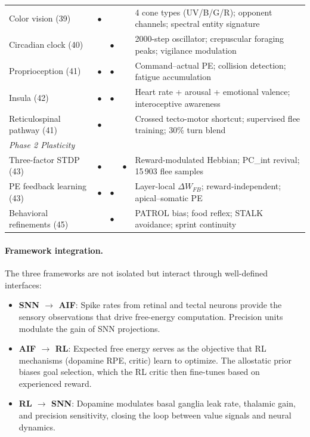 \documentclass[11pt,a4paper]{article}
\begin{document}
\begin{table}[H]
\begin{tabular}{lcccp{5.8cm}}
Color vision (39)                 & $\bullet$ & & & 4 cone types (UV/B/G/R); opponent channels; spectral entity signature \\
Circadian clock (40)              & & $\bullet$ & & 2000-step oscillator; crepuscular foraging peaks; vigilance modulation \\
Proprioception (41)               & $\bullet$ & $\bullet$ & & Command--actual PE; collision detection; fatigue accumulation \\
Insula (42)                       & $\bullet$ & $\bullet$ & & Heart rate + arousal + emotional valence; interoceptive awareness \\
Reticulospinal pathway (41)       & $\bullet$ & & & Crossed tecto-motor shortcut; supervised flee training; 30\% turn blend \\
\midrule
\multicolumn{5}{l}{\textit{Phase 2 Plasticity}} \\
Three-factor STDP (43)            & $\bullet$ & & $\bullet$ & Reward-modulated Hebbian; PC\_int revival; 15\,903 flee samples \\
PE feedback learning (43)         & $\bullet$ & $\bullet$ & & Layer-local $\Delta W_{FB}$; reward-independent; apical--somatic PE \\
Behavioral refinements (45)       & & $\bullet$ & & PATROL bias; food reflex; STALK avoidance; sprint continuity \\
\bottomrule
\end{tabular}
\end{table}

\paragraph{Framework integration.}
The three frameworks are not isolated but interact through
well-defined interfaces:
\begin{itemize}[nosep]
  \item \textbf{SNN $\to$ AIF}: Spike rates from retinal and tectal neurons
    provide the sensory observations that drive free-energy computation.
    Precision units modulate the gain of SNN projections.
  \item \textbf{AIF $\to$ RL}: Expected free energy serves as the objective
    that RL mechanisms (dopamine RPE, critic) learn to optimize.
    The allostatic prior biases goal selection, which the RL critic then
    fine-tunes based on experienced reward.
  \item \textbf{RL $\to$ SNN}: Dopamine modulates basal ganglia leak rate,
    thalamic gain, and precision sensitivity, closing the loop between
    value signals and neural dynamics.
\end{itemize}
\end{document}
